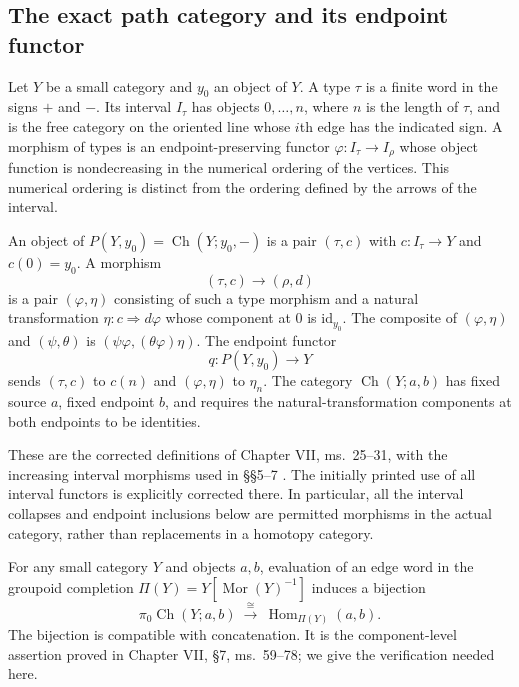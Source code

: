 \subsection{The exact path category and its endpoint functor}

\begin{definition}\label{G:definition}
Let $Y$ be a small category and $y_0$ an object of $Y$. A type $\tau$ is a finite word in the signs $+$ and $-$. Its interval $I_\tau$ has objects $0,\ldots,n$, where $n$ is the length of $\tau$, and is the free category on the oriented line whose $i$th edge has the indicated sign. A morphism of types is an endpoint-preserving functor $\varphi:I_\tau\to I_\rho$ whose object function is nondecreasing in the numerical ordering of the vertices. This numerical ordering is distinct from the ordering defined by the arrows of the interval.

An object of $P(Y,y_0)=\operatorname{Ch}(Y;y_0,-)$ is a pair $(\tau,c)$ with $c:I_\tau\to Y$ and $c(0)=y_0$. A morphism
\[
 (\tau,c)\longrightarrow(\rho,d)
\]
is a pair $(\varphi,\eta)$ consisting of such a type morphism and a natural transformation $\eta:c\Rightarrow d\varphi$ whose component at $0$ is $\mathrm{id}_{y_0}$. The composite of $(\varphi,\eta)$ and $(\psi,\theta)$ is $(\psi\varphi,(\theta\varphi)\eta)$. The endpoint functor
\[
 q:P(Y,y_0)\longrightarrow Y
\]
sends $(\tau,c)$ to $c(n)$ and $(\varphi,\eta)$ to $\eta_n$. The category $\operatorname{Ch}(Y;a,b)$ has fixed source $a$, fixed endpoint $b$, and requires the natural-transformation components at both endpoints to be identities.
\end{definition}

These are the corrected definitions of Chapter VII, ms.~25--31, with the increasing interval morphisms used in \S\S5--7 \citep{GrothendieckDerivateursVII}. The initially printed use of all interval functors is explicitly corrected there. In particular, all the interval collapses and endpoint inclusions below are permitted morphisms in the actual category, rather than replacements in a homotopy category.

\begin{proposition}\label{G:components}
For any small category $Y$ and objects $a,b$, evaluation of an edge word in the groupoid completion $\Pi(Y)=Y[\operatorname{Mor}(Y)^{-1}]$ induces a bijection
\[
 \pi_0\operatorname{Ch}(Y;a,b)
 \ \xrightarrow{\ \cong\ }\ \operatorname{Hom}_{\Pi(Y)}(a,b).
\]
The bijection is compatible with concatenation. It is the component-level assertion proved in Chapter VII, \S7, ms.~59--78; we give the verification needed here.
\end{proposition}

